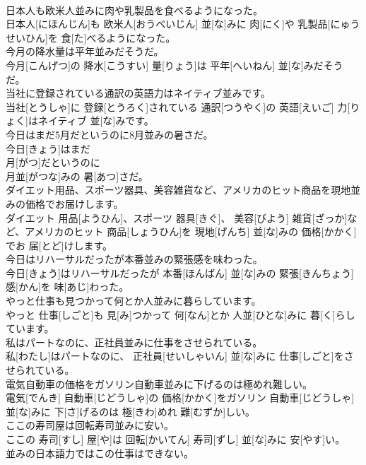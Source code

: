 \documentclass[8pt]{extreport}
\begin{document}
\begin{CJK}{UTF8}{min}
\\	日本人も欧米人並みに肉や乳製品を食べるようになった。	
\\	日本人[にほんじん]も 欧米人[おうべいじん] 並[な]みに 肉[にく]や 乳製品[にゅうせいひん]を 食[た]べるようになった。
\\	今月の降水量は平年並みだそうだ。	
\\	今月[こんげつ]の 降水[こうすい] 量[りょう]は 平年[へいねん] 並[な]みだそうだ。
\\	当社に登録されている通訳の英語力はネイティブ並みです。	
\\	当社[とうしゃ]に 登録[とうろく]されている 通訳[つうやく]の 英語[えいご] 力[りょく]はネイティブ 並[な]みです。
\\	今日はまだ5月だというのに8月並みの暑さだ。	
\\	今日[きょう]はまだ 
\\	月[がつ]だというのに 
\\	月並[がつな]みの 暑[あつ]さだ。
\\	ダイエット用品、スポーツ器具、美容雑貨など、アメリカのヒット商品を現地並みの価格でお届けします。	
\\	ダイエット 用品[ようひん]、スポーツ 器具[きぐ]、 美容[びよう] 雑貨[ざっか]など、アメリカのヒット 商品[しょうひん]を 現地[げんち] 並[な]みの 価格[かかく]でお 届[とど]けします。
\\	今日はリハーサルだったが本番並みの緊張感を味わった。	
\\	今日[きょう]はリハーサルだったが 本番[ほんばん] 並[な]みの 緊張[きんちょう] 感[かん]を 味[あじ]わった。
\\	やっと仕事も見つかって何とか人並みに暮らしています。	
\\	やっと 仕事[しごと]も 見[み]つかって 何[なん]とか 人並[ひとな]みに 暮[く]らしています。
\\	私はパートなのに、正社員並みに仕事をさせられている。	
\\	私[わたし]はパートなのに、 正社員[せいしゃいん] 並[な]みに 仕事[しごと]をさせられている。
\\	電気自動車の価格をガソリン自動車並みに下げるのは極めれ難しい。	
\\	電気[でんき] 自動車[じどうしゃ]の 価格[かかく]をガソリン 自動車[じどうしゃ] 並[な]みに 下[さ]げるのは 極[きわ]めれ 難[むずか]しい。
\\	ここの寿司屋は回転寿司並みに安い。	
\\	ここの 寿司[すし] 屋[や]は 回転[かいてん] 寿司[ずし] 並[な]みに 安[やす]い。
\\	並みの日本語力ではこの仕事はできない。	

\end{CJK}
\end{document}
